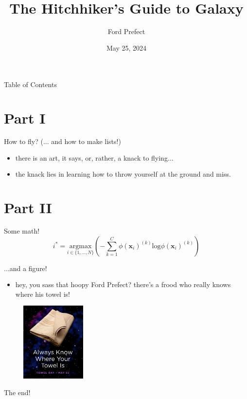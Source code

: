 \documentclass[aspectratio=169]{beamer}
\title{\bf{The Hitchhiker's Guide to Galaxy}}
\author{Ford Prefect}
\institute{Megadodo Publications Research}
\date{May 25, 2024}
\begin{document}
    \begin{frame}[plain]
        \titlepage
    \end{frame}

    \begin{frame}{Table of Contents}
        \tableofcontents{}
    \end{frame}

    \section{Part I}
    \begin{frame}{How to fly? (... and how to make lists!)}
        \begin{itemize}
            \item there is an art, it says, or, rather, a knack to flying...
            \item the knack lies in learning how to throw yourself at the ground and miss.
        \end{itemize}
    \end{frame}

    \section{Part II}
    \begin{frame}{Some math!}
        \begin{equation*}
            i^* = \underset{i \in \{1, \dots, N\}}{\text{argmax}} \left(-\sum\limits_{k=1}^{C} \phi(\mathbf{x}_i)^{(k)}\text{log}\phi(\mathbf{x}_i)^{(k)}\right)
        \end{equation*}
    \end{frame}

    \begin{frame}{...and a figure!}
        \begin{itemize}
            \item hey, you sass that hoopy Ford Prefect? there's a frood who really knows where his towel is!
        \end{itemize}

        \begin{figure}
            \centering
            \includegraphics[width=0.29\textwidth]{figures/towel.png}
        \end{figure}

    \end{frame}

    \begin{frame}[plain]
        \begin{center}
            \Huge{The end!}
        \end{center}
    \end{frame}
\end{document}
